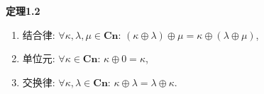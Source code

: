 \documentclass[UTF8]{ctexart}
\begin{document}
\vspace{10pt}

\hypertarget{sec:定理1.2}{}
\noindent\textbf{定理1.2}

\begin{enumerate}
    \item 结合律: $\forall\kappa,\lambda,\mu\in\mathbf{Cn}:\,
    (\kappa\oplus\lambda)\oplus\mu=\kappa\oplus(\lambda\oplus\mu)$,
    \item 单位元: $\forall\kappa\in\mathbf{Cn}:\,\kappa\oplus 0=\kappa$,
    \item 交换律: $\forall\kappa,\lambda\in\mathbf{Cn}:\,
    \kappa\oplus\lambda=\lambda\oplus\kappa$.
\end{enumerate}
\end{document}
